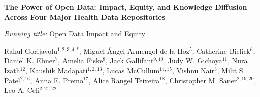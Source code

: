 \documentclass[11pt]{article}
\date{}
\begin{document}

\begin{center}
{\Large\bfseries The Power of Open Data: Impact, Equity, and Knowledge Diffusion\\[4pt]
Across Four Major Health Data Repositories}

\vspace{0.6em}
{\small\textit{Running title:} Open Data Impact and Equity}

\vspace{1em}

{\normalsize
Rahul Gorijavolu$^{1,2,3,4,*}$,
Miguel \'Angel Armengol de la Hoz$^{5}$,
Catherine Bielick$^{6}$,
Daniel K. Ebner$^{7}$,
Amelia Fiske$^{8}$,
Jack Gallifant$^{9,10}$,
Judy W. Gichoya$^{11}$,
Nura Izath$^{12}$,
Kaushik Madapati$^{1,2,13}$,
Lucas McCullum$^{14,15}$,
Vishnu Nair$^{3}$,
Milit S Patel$^{2,16}$,
Anna E. Premo$^{17}$,
Alice Rangel Teixeira$^{18}$,
Christopher M. Sauer$^{2,19,20}$,
Leo A. Celi$^{2,21,22}$
}

\vspace{0.8em}


\end{center}
\end{document}
